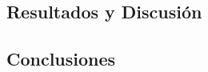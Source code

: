 







\subsection{Resultados y Discusión}\label{ssec:bwb-resultados-discusion}  %

\subsection{Conclusiones}\label{ssec:bwb-conclusiones}  %

